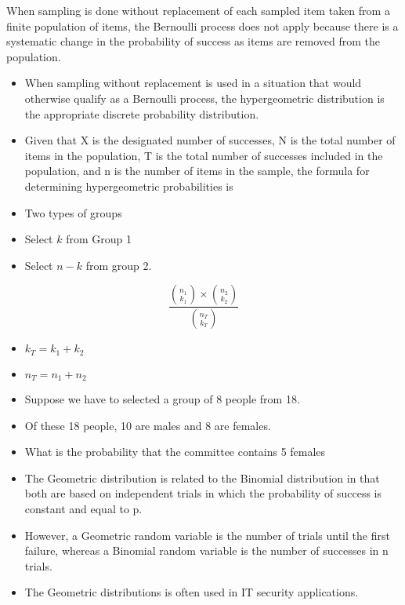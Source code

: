 \documentclass[]{report}
\begin{document}
{			
			
			When sampling is done without replacement of each sampled item taken from a finite population of items, the
			Bernoulli process does not apply because there is a systematic change in the probability of success as items are
			removed from the population. 
			
			
			\begin{itemize}
				\item	When sampling without replacement is used in a situation that would otherwise
				qualify as a Bernoulli process, the hypergeometric distribution is the appropriate discrete probability distribution.
				\item	Given that X is the designated number of successes, N is the total number of items in the population, T is
				the total number of successes included in the population, and n is the number of items in the sample, the formula
				for determining hypergeometric probabilities is
			\end{itemize}
			
			
			\begin{itemize}
					\item Two types of groups
		
					\item Select $k$ from Group 1
					\item Select $n-k$ from group 2.
				\end{itemize}
				
				\[ \frac{ {n_1 \choose k_1}\times {n_2 \choose k_2} }{{n_T \choose k_T}}  \]
				
				\begin{itemize}
					\item $k_T = k_1 + k_2$
					\item $n_T = n_1 + n_2$
					
					\item Suppose we have to selected a group of 8 people from 18.
					\item Of these 18 people, 10 are males and 8 are females.
					\item What is the probability that
					the committee contains 5 females
				\end{itemize}	


\newpage
	\begin{itemize}
		\item The Geometric distribution is related to the Binomial distribution in that
		both are based on independent trials in which the probability of success
		is constant and equal to p.
		\item However, a Geometric random variable is the number of trials until the
		first failure, whereas a Binomial random variable is the number of
		successes in n trials.
		\item The Geometric distributions is often used in IT security applications.
	\end{itemize}

}
\end{document}
